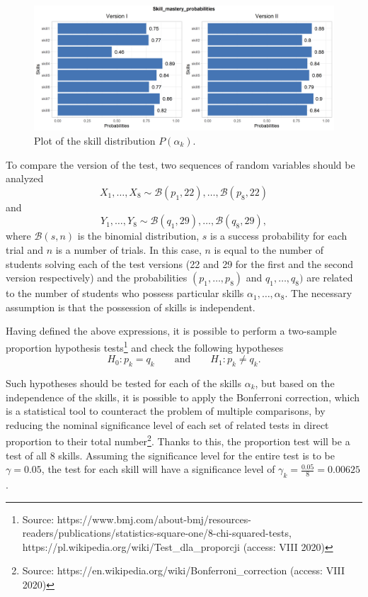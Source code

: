 \documentclass[english]{pwr_wmat_praca_dyplomowa}
\theoremstyle{plain}
\theoremstyle{definition}
\numberwithin{theorem}{chapter}
\begin{document}
\begin{figure}[h!]
	\centering
	\includegraphics[width=\textwidth]{Skill_mastery_probabilities.png}
	\caption{Plot of the skill distribution $P(\alpha_k)$.}
	\label{skill_possession_groups}
\end{figure}

To compare the version of the test, two sequences of random variables should be analyzed
$$ X_1, \ldots, X_8 \sim \mathcal{B}(p_1,22),\ldots,\mathcal{B}(p_8,22) $$
\noindent and
$$ Y_1, \ldots, Y_8 \sim \mathcal{B}(q_1,29),\ldots,\mathcal{B}(q_8,29), $$
where $\mathcal{B}(s,n)$ is the binomial distribution, $s$ is a success probability for each trial and $n$ is a number of trials. In this case, $n$ is equal to the number of students solving each of the test versions (22 and 29 for the first and the second version respectively) and the probabilities $(p_1,\ldots,p_8)$ and $q_1,\ldots,q_8)$ are related to the number of students who possess particular skills $\alpha_1,\ldots,\alpha_8$. The necessary assumption is that the possession of skills is independent. 

Having defined the above expressions, it is possible to perform a two-sample proportion hypothesis tests\footnote{Source: https://www.bmj.com/about-bmj/resources-readers/publications/statistics-square-one/8-chi-squared-tests, https://pl.wikipedia.org/wiki/Test\_dla\_proporcji (access: VIII 2020)} and check the following hypotheses
$$ H_0: p_k = q_k \qquad \text{and} \qquad H_1: p_k \neq q_k.$$

Such hypotheses should be tested for each of the skills $\alpha_{k}$, but based on the independence of the skills, it is possible to apply the Bonferroni correction, which is a statistical tool to counteract the problem of multiple comparisons, by reducing the nominal significance level of each set of related tests in direct proportion to their total number\footnote{Source: https://en.wikipedia.org/wiki/Bonferroni\_correction (access: VIII 2020)}. Thanks to this, the proportion test will be a test of all 8 skills. Assuming the significance level for the entire test is to be $\gamma = 0.05$, the test for each skill will have a significance level of $\gamma_k = \frac{0.05}{8} = 0.00625$. 
\end{document}
